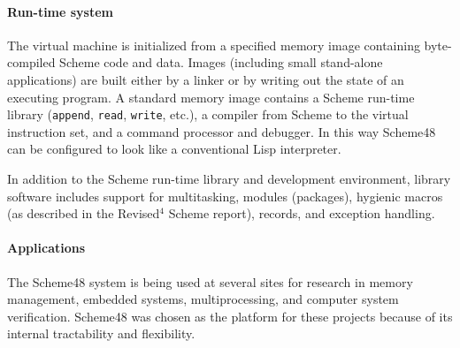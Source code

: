 \paragraph{Run-time system}

The virtual machine is initialized from a specified memory image
containing byte-compiled Scheme code and data.  Images (including
small stand-alone applications) are built either by a linker or by
writing out the state of an executing program.  A standard memory
image contains a Scheme run-time library ({\tt append}, {\tt read},
{\tt write}, etc.), a compiler from Scheme to the virtual instruction
set, and a command processor and debugger.  In this way Scheme48 can
be configured to look like a conventional Lisp interpreter.

In addition to the Scheme run-time library and development
environment, library software includes support for multitasking,
modules (packages), hygienic macros (as described in the Revised$^4$
Scheme report), records, and exception handling.

\paragraph{Applications}

The Scheme48 system is being used at several sites for research in
memory management, embedded systems, multiprocessing, and computer
system verification.  Scheme48 was chosen as the platform for these
projects because of its internal tractability and flexibility.



